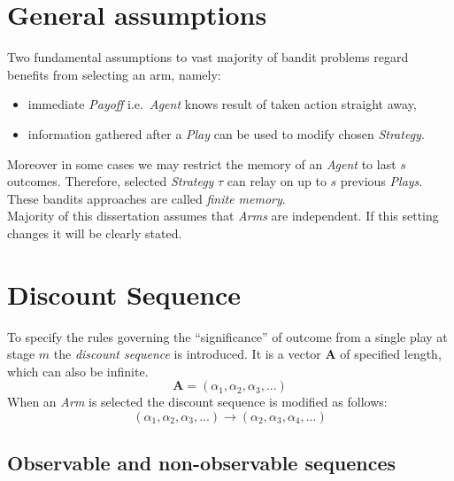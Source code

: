 \documentclass[12pt, a4paper, pdflatex, leqno]{report}
\begin{document}
\section{General assumptions}
Two fundamental assumptions to vast majority of bandit problems regard benefits from selecting an arm, namely:
\begin{itemize}
\item immediate \emph{Payoff} i.e.\ \emph{Agent} knows result of taken action straight away,
\item information gathered after a \emph{Play} can be used to modify chosen \emph{Strategy}.
\end{itemize}
Moreover in some cases we may restrict the memory of an \emph{Agent} to last $s$ outcomes. Therefore, selected \emph{Strategy} $\tau$ can relay on up to $s$ previous \emph{Plays}. These bandits approaches are called \emph{finite memory}.\\
Majority of this dissertation assumes that \emph{Arms} are independent. If this setting changes it will be clearly stated.


\section{Discount Sequence}
To specify the rules governing the ``significance'' of outcome from a single play at stage $m$ the \emph{discount sequence} is introduced. It is a vector $\mathbf{A}$ of specified length, which can also be infinite.
$$
\mathbf{A} = \left( \alpha_1, \alpha_2, \alpha_3, ... \right)
$$
When an \emph{Arm} is selected the discount sequence is modified as follows:
$$
\left( \alpha_1, \alpha_2, \alpha_3, ... \right)
\rightarrow
\left( \alpha_2, \alpha_3, \alpha_4, ... \right)
$$

\subsection{Observable and non-observable sequences}
\lipsum[1]
\end{document}
